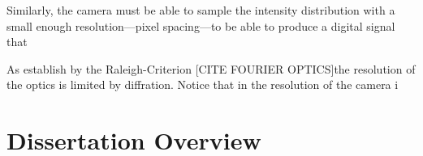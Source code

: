Similarly, the camera must be able to sample the intensity distribution with a small enough resolution---pixel spacing---to be able to produce a digital signal that

As establish by the Raleigh-Criterion [CITE FOURIER OPTICS]the resolution of the optics is limited by diffration. Notice that in the resolution of the camera i

\section{Dissertation Overview}





%  
%

